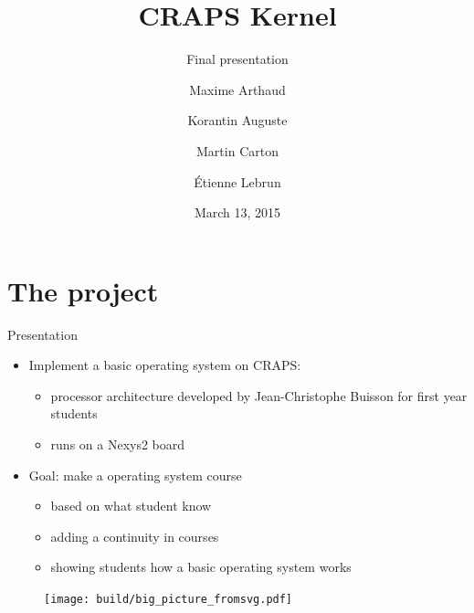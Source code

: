 \documentclass{beamer}
\title{CRAPS Kernel}
\subtitle{Final presentation}
\author{
       Maxime Arthaud
  \and Korantin Auguste
  \and Martin Carton
  \and Étienne Lebrun
}
\date{March 13, 2015}
\begin{document}
  \begin{frame}[plain]
    \titlepage%
  \end{frame}

  \begin{frame}[plain]
    \tableofcontents
  \end{frame}

  \section{The project}
    \begin{frame}{Presentation}
      \begin{itemize}
        \item Implement a basic operating system on CRAPS:
          \begin{itemize}
            \item processor architecture developed by Jean-Christophe
              Buisson for first year students
            \item runs on a Nexys2 board
          \end{itemize}
        \item Goal: make a operating system course
          \begin{itemize}
            \item based on what student know
            \item adding a continuity in courses
            \item showing students how a basic operating system works
          \end{itemize}
      \end{itemize}
    \end{frame}

    \begin{frame}[label=big_picture]
      \begin{figure}
        \centering
        \texttt{[image: build/big\_picture\_fromsvg.pdf]}
      \end{figure}
    \end{frame}
\end{document}
